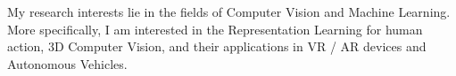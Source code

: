 


\begin{cventries}

\cvtext
{ %
\begin{cvitems}
    My research interests lie in the fields of Computer Vision and Machine Learning.
    More specifically, I am interested in the Representation Learning for human action,
    3D Computer Vision, and their applications in VR / AR devices and Autonomous Vehicles.
\end{cvitems}
}


\end{cventries}
